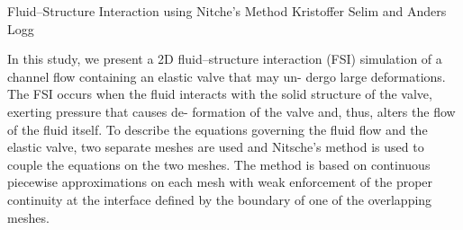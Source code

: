               {Fluid--Structure Interaction using Nitche's Method}
              {Kristoffer Selim and Anders Logg}

\editornote{[selim]}

In this study, we present a 2D fluid--structure interaction (FSI)
simulation of a channel flow containing an elastic valve that may un-
dergo large deformations. The FSI occurs when the fluid interacts with
the solid structure of the valve, exerting pressure that causes de-
formation of the valve and, thus, alters the flow of the fluid
itself. To describe the equations governing the fluid flow and the
elastic valve, two separate meshes are used and Nitsche's method is
used to couple the equations on the two meshes. The method is based on
continuous piecewise approximations on each mesh with weak enforcement
of the proper continuity at the interface defined by the boundary of
one of the overlapping meshes.

